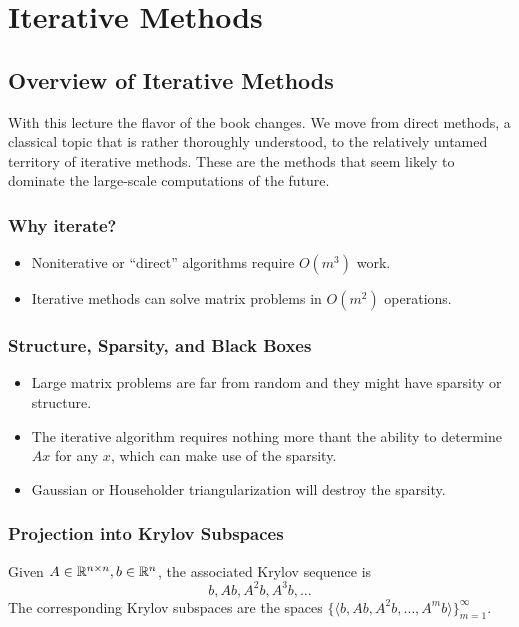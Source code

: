 \part{Iterative Methods}

\chapter{Overview of Iterative Methods} 
 
With this lecture the flavor of the book changes. We move from direct methods, a classical topic that is rather thoroughly understood, to the relatively untamed territory of iterative methods. These are the methods that seem likely to dominate the large-scale computations of the future.

\section{Why iterate?}

\begin{itemize}
    \item Noniterative or ``direct'' algorithms require $ O(m^3) $ work. 
    \item Iterative methods can solve matrix problems in $ O(m^{2} ) $ operations.
\end{itemize}
 
\section{Structure, Sparsity, and Black Boxes}
\begin{itemize}
    \item Large matrix problems are far from random and they might have sparsity or structure. 
    \item The iterative algorithm requires nothing more thant the ability to determine $ Ax $ for any $ x $, which can make use of the sparsity. 
    \item Gaussian or Householder triangularization will destroy the sparsity. 
\end{itemize} 

\section{Projection into Krylov Subspaces}
 
 \begin{definition}
 \label{def: Krylov subspaces}
 Given $ A\in \mathbb{R}^{n \times n}, b\in \mathbb{R}^{n} $, the associated Krylov sequence is
 \[
    b, Ab, A^{2} b, A^{3}b,\ldots 
 \]
 The corresponding Krylov subspaces are the spaces $ \{\langle b, Ab, A^{2} b,\ldots ,A^{m}b \rangle \}_{m=1}^\infty  $. 
 \end{definition}
 
